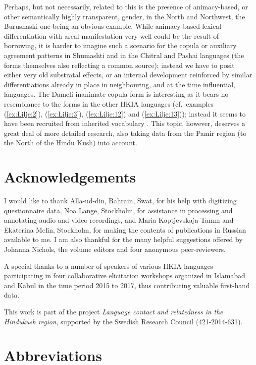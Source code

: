 \documentclass[output=collectionpaper]{langsci/langscibook}
\begin{document}
Perhaps, but not necessarily, related to this is the presence of animacy-based, or other semantically highly transparent, gender, in the North and Northwest, the Burushaski one being an obvious example. While animacy-based lexical differentiation with areal manifestation very well could be the result of borrowing, it is harder to imagine such a scenario for the copula or auxiliary agreement patterns in Shumashti and in the Chitral and Pashai languages (the forms themselves also reflecting a common source); instead we have to posit either very old substratal effects, or an internal development reinforced by similar differentiations already in place in neighbouring, and at the time influential, languages. The Dameli inanimate copula form is interesting as it bears no resemblance to the forms in the other HKIA languages (cf.\ examples (\ref{ex:Lilje:2}), (\ref{ex:Lilje:3}), (\ref{ex:Lilje:12}) and (\ref{ex:Lilje:13})); instead it seems to have been recruited from inherited vocabulary \citep[138]{Morgenstierne1942}. This topic, however, deserves a great deal of more detailed research, also taking data from the Pamir region (to the North of the Hindu Kush) into account.

\section*{Acknowledgements}

I would like to thank Alla-ud-din, Bahrain, Swat, for his help with digitizing questionnaire data, Noa Lange, Stockholm, for assistance in processing and annotating audio and video recordings, and Maria Koptjevskaja Tamm and Ekaterina Melin, Stockholm, for making the contents of publications in Russian available to me. I am also thankful for the many helpful suggestions offered by Johanna Nichols, the volume editors and four anonymous peer-reviewers.

A special thanks to a number of speakers of various HKIA languages participating in four collaborative elicitation workshops organized in Islamabad and Kabul in the time period 2015 to 2017, thus contributing valuable first-hand data.

This work is part of the project \textit{Language contact and relatedness in the Hindukush region}, supported by the Swedish Research Council (421-2014-631).

\section*{Abbreviations}
\end{document}
